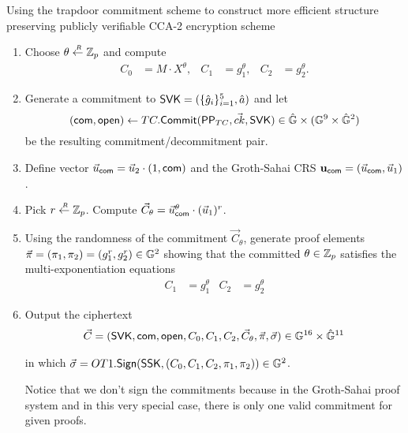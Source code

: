 \begin{section}{Using the trapdoor commitment scheme to construct more efficient structure preserving publicly verifiable CCA-2 encryption scheme}
\begin{description}
\begin{enumerate}
      \item Choose $\theta \stackrel{{\scriptscriptstyle \mkern4mu R}}{\gets} \mathbb{Z}_p$ and compute
        \begin{align*}
          C_0 &= M\cdot X^{\theta}, & C_1 &= g_1^{\theta}, & C_2 &= g_2^{\theta}.
        \end{align*}
      \item Generate a commitment to $\mathsf{SVK} = (\{\hat{g}_i\}_{i =1}^5, \hat{a})$ and let 
      $$(\mathsf{com}, \mathsf{open}) \gets TC.{\mathsf{Commit}}(\mathsf{PP}_{TC}, \vec{ck}, \mathsf{SVK}) \in \hat{\mathbb{G}} \times (\mathbb{G}^9 \times \hat{\mathbb{G}}^2)$$
			be the resulting commitment/decommitment pair.
      \item Define vector $\vec{u}_{\mathsf{com}} = \vec{u}_2\cdot (1, \mathsf{com})$ and the Groth-Sahai CRS $\mathbf{u}_{\mathsf{com}}=(\vec{u}_{\mathsf{com}},\vec{u}_1)$. 
      \item Pick $r \stackrel{{\scriptscriptstyle \mkern4mu R}}{\gets} \mathbb{Z}_p$. Compute $\vec{C}_{\theta} = \vec{u}_{\mathsf{com}}^{\theta} \cdot (\vec{u}_1)^r$.
      \item Using the randomness of the commitment $\vec{C}_{\theta}$, generate  proof elements $\vec{\pi}=(\pi_1,\pi_2)=(g_1^r,g_2^r) \in \mathbb{G}^2$ showing that the committed $\theta \in \mathbb{Z}_p$ satisfies the multi-exponentiation equations
        \begin{align*}
          C_1 &= g_1^{\theta} & C_2 &= g_2^{\theta}
        \end{align*}
      \item Output the ciphertext
        \begin{align*}
          \vec{C} = (\mathsf{SVK}, \mathsf{com}, \mathsf{open}, C_0, C_1, C_2, \vec{C}_{\theta}, \vec{\pi}, \vec{\sigma}) \in \mathbb{G}^{16} \times \hat{\mathbb{G}}^{11}
        \end{align*}
        
        
        in which $\vec{\sigma} = OT1.{\mathsf{Sign}}(\mathsf{SSK}, (C_0, C_1, C_2, {\pi}_1,\pi_2)) \in \mathbb{G}^2$.

        Notice that we don't sign the commitments because in the Groth-Sahai proof system and in this very special case, there is only one valid commitment for given proofs.
        
      \end{enumerate}
      

\end{description}
\end{section}
